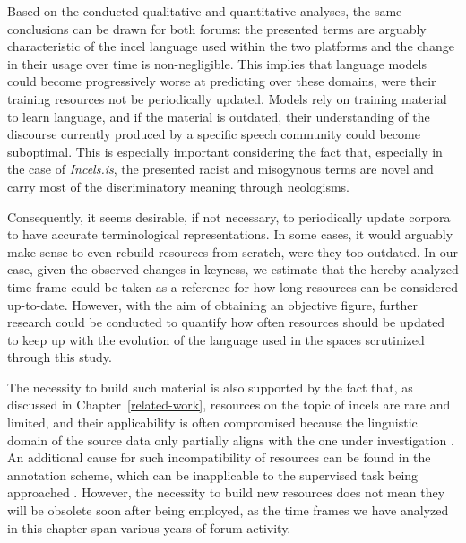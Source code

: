 \documentclass[11pt]{article}
\newcommand{\enforum}{\textit{Incels.is}}
\newcommand{\itforum}{\textit{Il forum dei brutti}}
\begin{document}

Based on the conducted qualitative and quantitative analyses, the same conclusions can be drawn for both forums: the presented terms are arguably characteristic of the incel language used within the two platforms and the change in their usage over time is non-negligible. This implies that language models could become progressively worse at predicting over these domains, were their training resources not be periodically updated. Models rely on training material to learn language, and if the material is outdated, their understanding of the discourse currently produced by a specific speech community could become suboptimal. This is especially important considering the fact that, especially in the case of \enforum, the presented racist and misogynous terms are novel and carry most of the discriminatory meaning through neologisms.

Consequently, it seems desirable, if not necessary, to periodically update corpora to have accurate terminological representations. In some cases, it would arguably make sense to even rebuild resources from scratch, were they too outdated. In our case, given the observed changes in keyness, we estimate that the hereby analyzed time frame could be taken as a reference for how long resources can be considered up-to-date. However, with the aim of obtaining an objective figure, further research could be conducted to quantify how often resources should be updated to keep up with the evolution of the language used in the spaces scrutinized through this study.

The necessity to build such material is also supported by the fact that, as discussed in Chapter~\ref{related-work}, resources on the topic of incels are rare and limited, and their applicability is often compromised because the linguistic domain of the source data only partially aligns with the one under investigation \cite{pelzer-2021-toxic-language-incel-communities}. An additional cause for such incompatibility of resources can be found in the annotation scheme, which can be inapplicable to the supervised task being approached \cite{zhou-2022-automated-hs-detection}. However, the necessity to build new resources does not mean they will be obsolete soon after being employed, as the time frames we have analyzed in this chapter span various years of forum activity.
\end{document}
